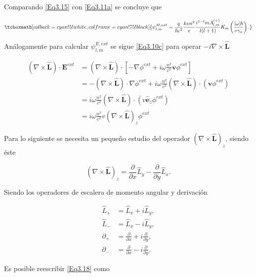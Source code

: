 \documentclass[a4paper,10pt]{article}
\newcommand{\hatbf}[1] {\hat{\mathbf{#1}}}	%
\begin{document}
Comparando \eqref{Eq3.15} con \eqref{Eq3.11a} se concluye que

\begin{equation}
\tcboxmath[colback=cyan!5!white,colframe=cyan!75!black]{
\psi_{l,m}^{M,ext}=\frac{q}{\hbar c^2}\frac{kvn^2}{\epsilon}\frac{i^{1-l}mA_{l,m}^{(+)}}{l(l+1)} K_m\left( \frac{|\omega|b}{v\gamma_n} \right).}
\end{equation}

Análogamente para calcular $\psi_{l,m}^{E,ext}$ se sigue \eqref{Eq3.10c} para operar $-i\nabla\times\hatbf{L}$

\begin{subequations}
\begin{align}
(\nabla\times\hatbf{L})\cdot\textbf{E}^{ext}
&=(\nabla\times\hatbf{L})\cdot\left[-\nabla\phi^{ext}+i\omega\frac{n^2}{c^2}\textbf{v}\phi^{ext}\right]	\\
&=-(\nabla\times\hatbf{L})\cdot\nabla\phi^{ext}+i\omega\frac{n^2}{c^2}(\nabla\times\hatbf{L})\cdot(\textbf{v}\phi^{ext})	\\
&=i\omega\frac{n^2}{c^2}(\nabla\times\hatbf{L})\cdot(v\hatbf{e}_z\phi^{ext})	\\
&=i\omega\frac{n^2}{c^2}v(\nabla\times\hatbf{L})_z\phi^{ext}
\end{align}
\label{Eq3.17}
\end{subequations}

Para lo siguiente se necesita un pequeño estudio del operador $(\nabla\times\hatbf{L})_z$, siendo éste

\begin{equation}
(\nabla\times\hatbf{L})_z=\frac{\partial}{\partial x} \hat{L}_y-\frac{\partial}{\partial y} \hat{L}_x.
\label{Eq3.18}
\end{equation}

Siendo los operadores de escalera de momento angular y derivación

\begin{subequations}
\begin{align}
\hat{L}_+	&=\hat{L}_x+i\hat{L}_y,	\\
\hat{L}_-	&=\hat{L}_x-i\hat{L}_y,	\\
\partial_+	&=\frac{\partial}{\partial x}+i\frac{\partial}{\partial y},	\\
\partial_-	&=\frac{\partial}{\partial x}-i\frac{\partial}{\partial y},
\end{align}
\end{subequations}

Es posible reescribir \eqref{Eq3.18} como
\end{document}
